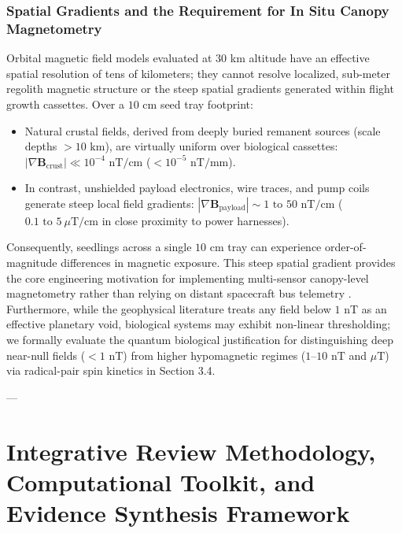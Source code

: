 \documentclass[default,sn-nature,iicol]{sn-jnl}
\begin{document}
\subsubsection{Spatial Gradients and the Requirement for In Situ Canopy Magnetometry}
Orbital magnetic field models evaluated at 30 km altitude have an effective spatial resolution of tens of kilometers; they cannot resolve localized, sub-meter regolith magnetic structure or the steep spatial gradients generated within flight growth cassettes. Over a $10\text{ cm}$ seed tray footprint:
\begin{itemize}
\item Natural crustal fields, derived from deeply buried remanent sources (scale depths $>10\text{ km}$), are virtually uniform over biological cassettes: $|\nabla \mathbf{B}_{\text{crust}}| \ll 10^{-4}\text{ nT/cm}$ ($< 10^{-5}\text{ nT/mm}$).
\item In contrast, unshielded payload electronics, wire traces, and pump coils generate steep local field gradients: $|\nabla \mathbf{B}_{\text{payload}}| \sim 1\text{ to }50\text{ nT/cm}$ ($0.1\text{ to }5\ \mu\text{T/cm}$ in close proximity to power harnesses).
\end{itemize}

Consequently, seedlings across a single $10\text{ cm}$ tray can experience order-of-magnitude differences in magnetic exposure. This steep spatial gradient provides the core engineering motivation for implementing multi-sensor canopy-level magnetometry rather than relying on distant spacecraft bus telemetry \cite{ref11,ref20}. Furthermore, while the geophysical literature treats any field below $1\text{ nT}$ as an effective planetary void, biological systems may exhibit non-linear thresholding; we formally evaluate the quantum biological justification for distinguishing deep near-null fields ($<1\text{ nT}$) from higher hypomagnetic regimes ($1\text{--}10\text{ nT}$ and $\mu\text{T}$) via radical-pair spin kinetics in Section 3.4.

---


\section{Integrative Review Methodology, Computational Toolkit, and Evidence Synthesis Framework}
\end{document}
